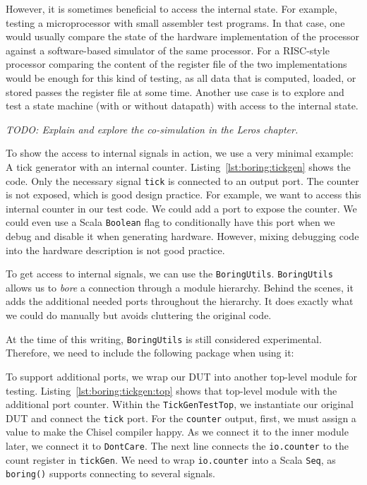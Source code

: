 \documentclass[%
    10pt,
    headinclude, footinclude=false,
    openright, %
    notitlepage,
    cleardoublepage=empty,
    headsepline,
    numbers=noenddot,
    bibliography=totoc, index=totoc,
    ]{scrbook}
\newcommand{\code}[1]{{\lstinline[basicstyle=\small\ttfamily]{#1}}}
\newcommand{\todo}[1]{{\emph{TODO: #1}}}
\begin{document}
However, it is sometimes beneficial to access the internal state. For example,
testing a microprocessor with small assembler test programs.
In that case, one would usually compare the state of the hardware implementation of
the processor against a software-based simulator of the same processor.
For a RISC-style processor comparing the content of the register file of the two implementations
would be enough for this kind of testing, as all data that is computed, loaded,
or stored passes the register file at some time.
Another use case is to explore and test a state machine (with or without datapath)
with access to the internal state.


\todo{Explain and explore the co-simulation in the Leros chapter.}



To show the access to internal signals in action, we use a very minimal example:
A tick generator with an internal counter. Listing~\ref{lst:boring:tickgen} shows the code.
Only the necessary signal \code{tick} is connected to an output port.
The counter is not exposed, which is good design practice.
For example, we want to access this internal counter in our test code.
We could add a port to expose the counter. We could even use a Scala \code{Boolean}
flag to conditionally have this port when we debug and disable it
when generating hardware.
However, mixing debugging code into the hardware description is not good practice.


To get access to internal signals, we can use the \code{BoringUtils}. 
\code{BoringUtils} allows us to \emph{bore} a connection through a module hierarchy.
Behind the scenes, it adds the additional needed ports throughout the hierarchy.
It does exactly what we could do manually but avoids cluttering the original code.

At the time of this writing, \code{BoringUtils} is still considered experimental.
Therefore, we need to include the following package when using it:



To support additional ports, we wrap our DUT into another top-level module for testing.
Listing~\ref{lst:boring:tickgen:top} shows that top-level module with the additional port
counter. Within the \code{TickGenTestTop}, we instantiate our original DUT and connect
the \code{tick} port. For the \code{counter} output, first, we must assign a value to
make the Chisel compiler happy. As we connect it to the inner module later,
we connect it to \code{DontCare}.
The next line connects the \code{io.counter} to the count register in \code{tickGen}.
We need to wrap \code{io.counter} into a Scala \code{Seq}, as \code{boring()} supports
connecting to several signals.
\end{document}
